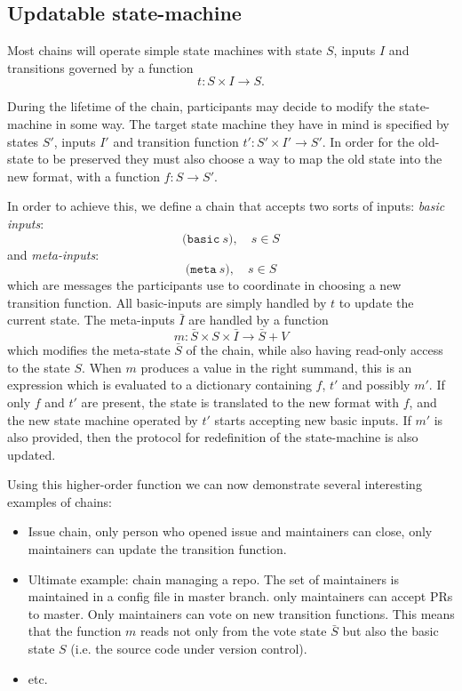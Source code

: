 \subsection{Updatable state-machine}

Most chains will operate simple state machines with state $S$, inputs $I$ and
transitions governed by a function
\[
t \colon S \times I \to S.
\]

During the lifetime of the chain, participants may decide to modify the
state-machine in some way. The target state machine they have in mind is
specified by states $S'$, inputs $I'$ and transition function $t' \colon S'
\times I' \to S'$. In order for the old-state to be preserved they must also
choose a way to map the old state into the new format, with a function $f \colon
S \to S'$.

In order to achieve this, we define a chain that accepts two sorts of inputs:
\emph{basic inputs}:
\[
\mathtt{(basic} \ s), \quad s \in S
\]
and \emph{meta-inputs}:
\[
\mathtt{(meta} \ s), \quad s \in S
\]
which are messages the participants use to coordinate in choosing a new
transition function. All basic-inputs are simply handled by $t$ to update the
current state. The meta-inputs $\bar I$ are handled by a function
\[
m \colon \bar S \times S \times \bar I \to \bar S + V
\]
which modifies the meta-state $\bar S$ of the chain, while also having read-only
access to the state $S$. When $m$ produces a value in the right summand, this is
an expression which is evaluated to a dictionary containing $f$, $t'$ and
possibly $m'$. If only $f$ and $t'$ are present, the state is translated to the
new format with $f$, and the new state machine operated by $t'$ starts accepting
new basic inputs. If $m'$ is also provided, then the protocol for redefinition
of the state-machine is also updated.

Using this higher-order function we can now demonstrate several interesting
examples of chains:
\begin{itemize}
\item Issue chain, only person who opened issue and maintainers can close, only
  maintainers can update the transition function.
\item Ultimate example: chain managing a repo. The set of maintainers is
  maintained in a config file in master branch. only maintainers can accept PRs
  to master. Only maintainers can vote on new transition functions. This means
  that the function $m$ reads not only from the vote state $\bar S$ but also the
  basic state $S$ (i.e. the source code under version control).
\item etc.
\end{itemize}
